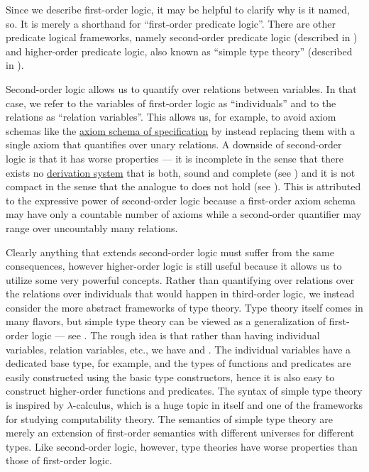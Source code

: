 \begin{remark}\label{rem:higher_order_logic}
  Since we describe first-order logic, it may be helpful to clarify why is it named, so. It is merely a shorthand for \enquote{first-order predicate logic}. There are other predicate logical frameworks, namely second-order predicate logic (described in \cite[ch. VIII]{OpenLogicFull}) and higher-order predicate logic, also known as \enquote{simple type theory} (described in \cite[sec. 3]{Farmer2008}).

  Second-order logic allows us to quantify over relations between variables. In that case, we refer to the variables of first-order logic as \enquote{individuals} and to the relations as \enquote{relation variables}. This allows us, for example, to avoid axiom schemas like the \hyperref[def:zfc/specification]{axiom schema of specification} by instead replacing them with a single axiom that quantifies over unary relations. A downside of second-order logic is that it has worse properties --- it is incomplete in the sense that there exists no \hyperref[def:proof_derivation_system]{derivation system} that is both, sound and complete (see \cite[thm. 39.6]{OpenLogicFull}) and it is not compact in the sense that the analogue to  does not hold (see \cite[thm. 39.7]{OpenLogicFull}). This is attributed to the expressive power of second-order logic because a first-order axiom schema may have only a countable number of axioms while a second-order quantifier may range over uncountably many relations.

  Clearly anything that extends second-order logic must suffer from the same consequences, however higher-order logic is still useful because it allows us to utilize some very powerful concepts. Rather than quantifying over relations over the relations over individuals that would happen in third-order logic, we instead consider the more abstract frameworks of type theory. Type theory itself comes in many flavors, but simple type theory can be viewed as a generalization of first-order logic --- see \cite[thm. 2]{Farmer2008}. The rough idea is that rather than having individual variables, relation variables, etc., we have  and . The individual variables have a dedicated base type, for example, and the types of functions and predicates are easily constructed using the basic type constructors, hence it is also easy to construct higher-order functions and predicates. The syntax of simple type theory is inspired by \( \lambda \)-calculus, which is a huge topic in itself and one of the frameworks for studying computability theory. The semantics of simple type theory are merely an extension of first-order semantics with different universes for different types. Like second-order logic, however, type theories have worse properties than those of first-order logic.


\end{remark}
